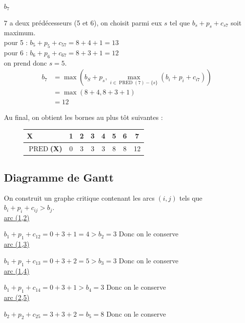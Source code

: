 \documentclass[12pt]{article}
\newcommand{\mmax}{\ensuremath{\operatorname{max}}}
\newcommand{\mpred}{\ensuremath{\operatorname{PRED}}}
\begin{document}
\underline{$b_7$}

$7$ a deux prédécesseurs (5 et 6), on choisit parmi eux $s$ tel
que $b_s + p_s + c_{s7}$ soit maximum.\\
pour 5 : $b_5 + p_5 + c_{57} = 8 + 4 + 1 = 13$\\
pour 6 : $b_6 + p_6 + c_{67} = 8 + 3 + 1 = 12$\\
on prend donc $s = 5$.
\begin{align*}
  b_7 &= \mmax(b_S + p_s, \mmax_{i \in \mpred(7) - \{s\}}(b_i + p_i + c_{i7}))\\
  &= \mmax(8 + 4, 8 + 3 + 1)\\
  &= 12
\end{align*}

Au final, on obtient les bornes au plus tôt suivantes :

\begin{figure}[H]
  \centering

  \begin{tabular}{|l|c|c|c|c|c|c|c|}
    \hline
    \textbf{X} & 1 & 2 & 3 & 4 & 5 & 6 & 7 \\
    \hline
    \textbf{\mpred(X)} & 0 & 3 & 3 & 3 & 8 & 8 & 12 \\
    \hline
  \end{tabular}

\end{figure}

\subsection{Diagramme de Gantt}

On construit un graphe critique contenant les arcs $(i,j)$ tels que
$b_i + p_i + c_{ij} > b_j$.\\

\underline{arc (1,2)}

$b_1 + p_1 + c_{12} = 0 + 3 + 1 = 4 > b_2 = 3$ Donc on le conserve\\

\underline{arc (1,3)}

$b_1 + p_1 + c_{13} = 0 + 3 + 2 = 5 > b_3 = 3$ Donc on le conserve\\

\underline{arc (1,4)}

$b_1 + p_1 + c_{14} = 0 + 3 + 1 > b_4 = 3$ Donc on le conserve\\

\underline{arc (2,5)}

$b_2 + p_2 + c_{25} = 3 + 3 + 2 = b_5 = 8$ Donc on le conserve\\
\end{document}
